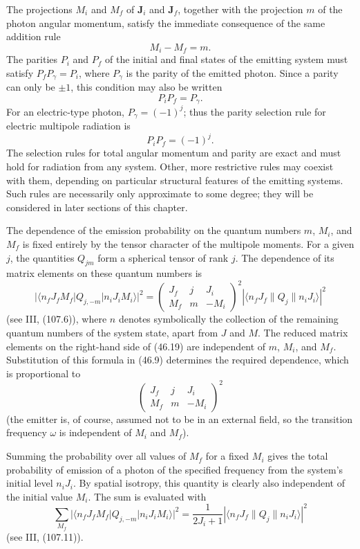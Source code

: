 The projections $M_i$ and $M_f$ of $\mathbf J_i$ and $\mathbf J_f$, together with the projection $m$ of the photon angular momentum, satisfy the immediate consequence of the same addition rule
\begin{equation}
M_i-M_f=m.
\tag{46.16}
\end{equation}
The parities $P_i$ and $P_f$ of the initial and final states of the emitting system must satisfy $P_fP_\gamma=P_i$, where $P_\gamma$ is the parity of the emitted photon. Since a parity can only be $\pm1$, this condition may also be written
\begin{equation}
P_iP_f=P_\gamma.
\tag{46.17}
\end{equation}
For an electric-type photon, $P_\gamma=(-1)^j$; thus the parity selection rule for electric multipole radiation is
\begin{equation}
P_iP_f=(-1)^j.
\tag{46.18}
\end{equation}
The selection rules for total angular momentum and parity are exact and must hold for radiation from any system. Other, more restrictive rules may coexist with them, depending on particular structural features of the emitting systems. Such rules are necessarily only approximate to some degree; they will be considered in later sections of this chapter.

The dependence of the emission probability on the quantum numbers $m$, $M_i$, and $M_f$ is fixed entirely by the tensor character of the multipole moments. For a given $j$, the quantities $Q_{jm}$ form a spherical tensor of rank $j$. The dependence of its matrix elements on these quantum numbers is
\begin{equation}
|\langle n_fJ_fM_f|Q_{j,-m}|n_iJ_iM_i\rangle|^2
=\begin{pmatrix}J_f&j&J_i\\M_f&m&-M_i\end{pmatrix}^{\!2}
|\langle n_fJ_f\|Q_j\|n_iJ_i\rangle|^2
\tag{46.19}
\end{equation}
(see III, (107.6)), where $n$ denotes symbolically the collection of the remaining quantum numbers of the system state, apart from $J$ and $M$. The reduced matrix elements on the right-hand side of (46.19) are independent of $m$, $M_i$, and $M_f$. Substitution of this formula in (46.9) determines the required dependence, which is proportional to
\[
\begin{pmatrix}J_f&j&J_i\\M_f&m&-M_i\end{pmatrix}^{\!2}
\]
(the emitter is, of course, assumed not to be in an external field, so the transition frequency $\omega$ is independent of $M_i$ and $M_f$).

Summing the probability over all values of $M_f$ for a fixed $M_i$ gives the total probability of emission of a photon of the specified frequency from the system's initial level $n_iJ_i$. By spatial isotropy, this quantity is clearly also independent of the initial value $M_i$. The sum is evaluated with
\begin{equation}
\sum_{M_f}|\langle n_fJ_fM_f|Q_{j,-m}|n_iJ_iM_i\rangle|^2
=\frac1{2J_i+1}|\langle n_fJ_f\|Q_j\|n_iJ_i\rangle|^2
\tag{46.20}
\end{equation}
(see III, (107.11)).
